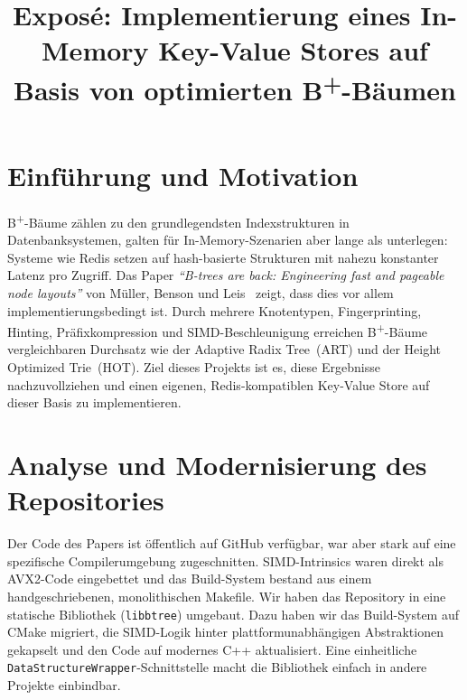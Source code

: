 \documentclass[conference]{IEEEtran}
\begin{document}
\title{\large Exposé: Implementierung eines In-Memory Key-Value Stores auf Basis von optimierten B\textsuperscript{+}-Bäumen}

\author{
}

\maketitle
\renewcommand{\figureautorefname}{Abb.}

\section{Einführung und Motivation}

B\textsuperscript{+}-Bäume zählen zu den grundlegendsten Indexstrukturen in Datenbanksystemen,
galten für In-Memory-Szenarien aber lange als unterlegen: Systeme wie Redis setzen auf
hash-basierte Strukturen mit nahezu konstanter Latenz pro Zugriff.
Das Paper \emph{``B-trees are back: Engineering fast and pageable node layouts''}
von Müller, Benson und Leis~\cite{muller2025b} zeigt, dass dies vor allem
implementierungsbedingt ist. Durch mehrere Knotentypen, Fingerprinting, Hinting,
Präfixkompression und SIMD-Beschleunigung erreichen B\textsuperscript{+}-Bäume
vergleichbaren Durchsatz wie der Adaptive Radix Tree~(ART) und der Height Optimized Trie~(HOT).
Ziel dieses Projekts ist es, diese Ergebnisse nachzuvollziehen und einen eigenen,
Redis-kompatiblen Key-Value Store auf dieser Basis zu implementieren.

\section{Analyse und Modernisierung des Repositories}

Der Code des Papers ist öffentlich auf GitHub verfügbar, war aber stark auf eine spezifische
Compilerumgebung zugeschnitten. SIMD-Intrinsics waren direkt als AVX2-Code eingebettet
und das Build-System bestand aus einem handgeschriebenen, monolithischen Makefile.
Wir haben das Repository in eine statische Bibliothek (\texttt{libbtree}) umgebaut.
Dazu haben wir das Build-System auf CMake migriert, die SIMD-Logik hinter
plattformunabhängigen Abstraktionen gekapselt und den Code auf modernes C++ aktualisiert.
Eine einheitliche \texttt{DataStructureWrapper}-Schnittstelle macht die Bibliothek
einfach in andere Projekte einbindbar.
\end{document}

